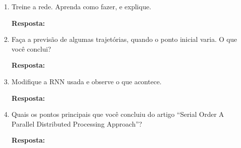 \documentclass[12 pt]{article}
\begin{document}
\begin{enumerate}
    \item Treine a rede. Aprenda como fazer, e explique.
   
    \textbf{Resposta:} \par

    \item Faça a previsão de algumas trajetórias, quando o ponto inicial varia. O que você conclui?
   
    \textbf{Resposta:} \par

    \item Modifique a RNN usada e observe o que acontece.

    \textbf{Resposta:} \par

    \item Quais os pontos principais que você concluiu do artigo “Serial Order A Parallel Distributed Processing Approach”?
        
    \textbf{Resposta:} \par

\end{enumerate}


\end{document}
